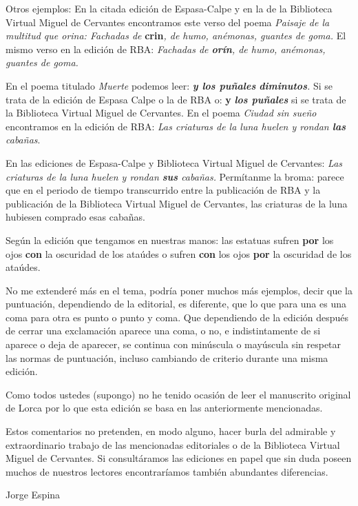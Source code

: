 \documentclass[
    a5paper,
    DIV=10,
    12pt,
    notitlepage,
    oneside,]
{scrbook} %
\begin{document}
Otros ejemplos: En la citada edición de Espasa-Calpe y en la de la
Biblioteca Virtual Miguel de Cervantes encontramos este verso del poema
\emph{Paisaje de la multitud que orina: Fachadas de}
\textbf{crin}\emph{, de humo, anémonas, guantes de goma.} El mismo verso
en la edición de RBA: \emph{Fachadas de \textbf{orín}, de humo,
anémonas, guantes de goma.}

En el poema titulado \emph{Muerte} podemos leer: \emph{\textbf{y los
puñales} \textbf{diminutos}.} Si se trata de la edición de Espasa Calpe
o la de RBA o: \textbf{y} \textbf{\emph{los puñales}} si se trata de la
Biblioteca Virtual Miguel de Cervantes. En el poema \emph{Ciudad sin
sueño} encontramos en la edición de RBA: \emph{Las criaturas de la luna
huelen y rondan \textbf{las} cabañas}.

En las ediciones de Espasa-Calpe y Biblioteca Virtual Miguel de
Cervantes: \emph{Las criaturas de la luna huelen y rondan \textbf{sus}
cabañas.} Permítanme la broma: parece que en el periodo de tiempo
transcurrido entre la publicación de RBA y la publicación de la
Biblioteca Virtual Miguel de Cervantes, las criaturas de la luna
hubiesen comprado esas cabañas.

Según la edición que tengamos en nuestras manos: las estatuas sufren
\textbf{por} los ojos \textbf{con} la oscuridad de los ataúdes o sufren
\textbf{con} los ojos \textbf{por} la oscuridad de los ataúdes.

No me extenderé más en el tema, podría poner muchos más ejemplos, decir
que la puntuación, dependiendo de la editorial, es diferente, que lo que
para una es una coma para otra es punto o punto y coma. Que dependiendo
de la edición después de cerrar una exclamación aparece una coma, o no,
e indistintamente de si aparece o deja de aparecer, se continua con
minúscula o mayúscula sin respetar las normas de puntuación, incluso
cambiando de criterio durante una misma edición.

Como todos ustedes (supongo) no he tenido ocasión de leer el manuscrito
original de Lorca por lo que esta edición se basa en las anteriormente
mencionadas.

Estos comentarios no pretenden, en modo alguno, hacer burla del
admirable y extraordinario trabajo de las mencionadas editoriales o de
la Biblioteca Virtual Miguel de Cervantes. Si consultáramos las
ediciones en papel que sin duda poseen muchos de nuestros lectores
encontraríamos también abundantes diferencias.

Jorge Espina
\end{document}
